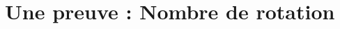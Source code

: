 \chapter{Une preuve : Nombre de rotation}





\newcommand{\Tbb}{{\mathbb{T}}}
\newcommand{\Rbb}{{\mathbb{R}}}
\newcommand{\Qbb}{{\mathbb{Q}}}
\newcommand{\Zbb}{{\mathbb{Z}}}
\newcommand{\Nbb}{{\mathbb{N}}}
\newcommand{\Ec}{{\mathcal{E}}}
\newcommand{\sphere}{\mathbb{S}^1}
\newcommand{\Cc}{\mathcal{C}}
\newcommand{\Id}{\mathrm{Id}}
\newcommand{\HomT}{\mathrm{Hom}^+(\Tbb)}
\newcommand{\HommoinsT}{\mathrm{Hom}^-(\Tbb)}
\newcommand{\Tent}{\mathcal{T}_{\mathrm{ent}}}
\newcommand*{\EnsembleQuotient}[2]{\ensuremath{#1/#2}}




